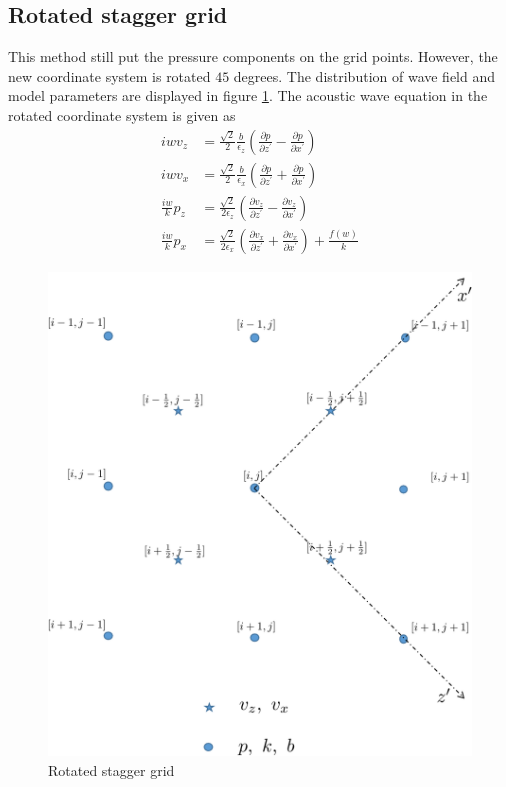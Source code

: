 \documentclass[revised,endfloat]{geophysics}
\begin{document}
\subsection{Rotated stagger grid}
This method still put the pressure components on the grid points. However, the new coordinate system is rotated $45$ degrees. The distribution of wave field and model parameters are displayed in figure \ref{f2}. The acoustic wave equation in the rotated coordinate system is given as 
\begin{equation}
\begin{split}
iw v_z &= \frac{\sqrt{2}}{2} \frac{b}{\epsilon_z} \left(\frac{\partial p}{\partial z^{\prime}} -\frac{\partial p}{\partial x^{\prime}} \right)  \\
iw v_x &= \frac{\sqrt{2}}{2} \frac{b}{\epsilon_x} \left( \frac{\partial p}{\partial z^{\prime}} + \frac{\partial p}{\partial x^{\prime}}  \right)   \\
\frac{iw}{k} p_z &= \frac{\sqrt{2}}{2\epsilon_z} \left( \frac{\partial v_z}{\partial z^{\prime}} - \frac{\partial v_z}{\partial x^{\prime}} \right)     \\
\frac{iw}{k} p_x &= \frac{\sqrt{2}}{2\epsilon_x} \left( \frac{\partial v_x}{\partial z^{\prime}} + \frac{\partial v_x}{\partial x^{\prime}} \right) + \frac{f(w)}{k}
\end{split}
\label{eq102}   
\end{equation}

\begin{figure}[htb] 
   \centering
   \includegraphics[width=0.6\columnwidth]{Fig/f2.pdf} 
   \caption{Rotated stagger grid}
   \label{f2}
\end{figure}
\end{document}
